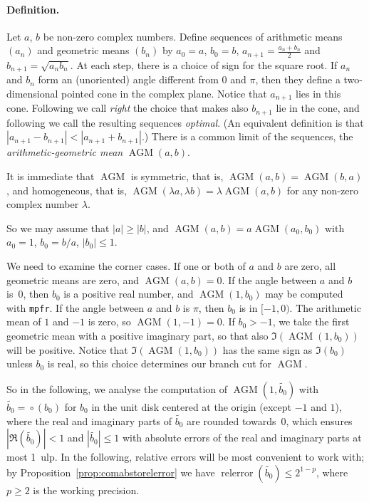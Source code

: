 \documentclass [11pt]{article}
\newcommand {\corr}[1]{{#1}}
\newcommand {\appro}[1]{\widetilde {#1}}
\newcommand {\mpfr}{{\tt mpfr}}
\newcommand {\ulp}[1]{#1~ulp}
\newcommand{\relerror}{\operatorname {relerror}}
\newcommand {\round}{\operatorname {\circ}}
\renewcommand {\leq}{\leqslant}
\renewcommand {\geq}{\geqslant}
\newcommand {\AGM}{\operatorname{AGM}}
\begin{document}
\paragraph {Definition.}
Let $a$, $b$ be non-zero complex numbers.
Define sequences of arithmetic means $(a_n)$
and geometric means $(b_n)$
by $\corr {a_0} = a$, $\corr {b_0} = b$,
$\corr {a_{n+1}} = \frac {\corr {a_n} + \corr {b_n}}{2}$ and
$\corr {b_{n+1}} = \sqrt {\corr {a_n} \corr {b_n}}$.
At each step, there is a choice of sign for the square root.
If $\corr {a_n}$ and $\corr {b_n}$ form an (unoriented) angle
different from $0$ and $\pi$, then
they define a two-dimensional pointed cone in the complex plane.
Notice that $\corr {a_{n+1}}$ lies in this cone.
Following \cite {Cox84} we call \emph {right} the choice that makes
also $\corr {b_{n+1}}$ lie in the cone, and following \cite {CrTh13}
we call the resulting sequences \emph {optimal}.
(An equivalent definition is that $|a_{n+1} - b_{n+1}| < |a_{n+1} + b_{n+1}|$.)
There is a common limit of the sequences, the
\emph {arithmetic-geometric mean}
$\AGM (a, b)$.

It is immediate that $\AGM$ is symmetric, that is,
$\AGM (a, b) = \AGM (b, a)$, and homogeneous, that is,
$\AGM (\lambda a, \lambda b) = \lambda \AGM (a, b)$ for any non-zero
complex number $\lambda$.

So we may assume that $|a| \geq |b|$, and
$\AGM (a, b) = a \AGM (a_0, b_0)$
with $\corr {a_0} = 1$, $\corr {b_0} = b/a$, $|\corr {b_0}| \leq 1$.

We need to examine the corner cases.
If one or both of $a$ and $b$ are zero, all geometric means are zero,
and $\AGM (a, b) = 0$.
If the angle between $a$ and $b$ is~$0$, then $\corr {b_0}$ is a positive real
number, and $\AGM (1, \corr {b_0})$ may be computed with \mpfr.
If the angle between $a$ and $b$ is $\pi$, then $\corr {b_0}$ is in
$[-1,0)$. The arithmetic mean of $1$ and $-1$
is zero, so $\AGM (1, -1) = 0$.
If $\corr {b_0} > -1$, we take the first geometric mean with a positive imaginary
part, so that also $\Im (\AGM (1, \corr {b_0}))$ will be positive.
Notice that $\Im (\AGM (1, \corr {b_0}))$ has the same sign as
$\Im (\corr {b_0})$ unless
$\corr {b_0}$ is real, so this choice determines our branch cut for $\AGM$.

So in the following, we analyse the computation of $\AGM (1, \appro {b_0})$
with
$\appro {b_0} = \round (\corr {b_0})$
for $b_0$ in the unit disk centered at the origin (except $-1$ and $1$),
where the real and imaginary parts of $\appro {b_0}$ are rounded
towards~$0$,
which ensures $\left| \Re (\appro {b_0}) \right| < 1$
and $| \appro {b_0} | \leq 1$
with absolute errors of the real and imaginary parts at most \ulp {1}.
In the following, relative errors will be most convenient to work with;
by Proposition~\ref {prop:comabstorelerror} we have
$\relerror (\appro {b_0}) \leq 2^{1-p}$, where $p \geq 2$ is the working precision.
\end{document}
